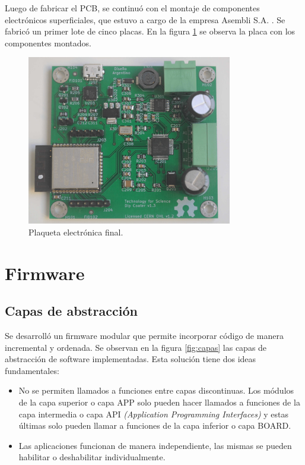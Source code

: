 Luego de fabricar el PCB, se continuó con el montaje de componentes electrónicos superficiales, que estuvo a cargo de la empresa Asembli S.A. \citep{web_asembli}. Se fabricó un primer lote de cinco placas. En la figura \ref{fig:dip_real_model} se observa la placa con los componentes montados.


\begin{figure}[htbp]
	\centering
	\includegraphics[width=0.8\textwidth]{./Figures/dip_real_model.jpg}
	\caption{Plaqueta electrónica final.}
	\label{fig:dip_real_model}
\end{figure}


\section{Firmware}
\subsection{Capas de abstracción}

Se desarrolló un firmware modular que permite incorporar código de manera incremental y ordenada. Se observan en la figura \ref{fig:capas} las capas de abstracción de software implementadas. Esta solución tiene dos ideas fundamentales:

\begin{itemize}
\item No se permiten llamados a funciones entre capas discontinuas. Los módulos de la capa superior o capa APP solo pueden hacer llamados a funciones de la capa intermedia o capa API \textit{(Application Programming Interfaces)} y estas últimas solo pueden llamar a funciones de la capa inferior o capa BOARD.
\item Las aplicaciones funcionan de manera independiente, las mismas se pueden habilitar o deshabilitar individualmente.
\end{itemize}

